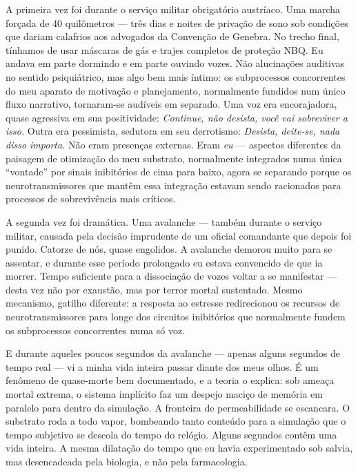 \documentclass[11pt, twoside, openright]{book}
\begin{document}
A primeira vez foi durante o serviço militar obrigatório austríaco. Uma marcha forçada de 40 quilômetros --- três dias e noites de privação de sono sob condições que dariam calafrios aos advogados da Convenção de Genebra. No trecho final, tínhamos de usar máscaras de gás e trajes completos de proteção NBQ. Eu andava em parte dormindo e em parte ouvindo vozes. Não alucinações auditivas no sentido psiquiátrico, mas algo bem mais íntimo: os subprocessos concorrentes do meu aparato de motivação e planejamento, normalmente fundidos num único fluxo narrativo, tornaram-se audíveis em separado. Uma voz era encorajadora, quase agressiva em sua positividade: \textit{Continue, não desista, você vai sobreviver a isso.} Outra era pessimista, sedutora em seu derrotismo: \textit{Desista, deite-se, nada disso importa.} Não eram presenças externas. Eram \textit{eu} --- aspectos diferentes da paisagem de otimização do meu substrato, normalmente integrados numa única ``vontade'' por sinais inibitórios de cima para baixo, agora se separando porque os neurotransmissores que mantêm essa integração estavam sendo racionados para processos de sobrevivência mais críticos.

A segunda vez foi dramática. Uma avalanche --- também durante o serviço militar, causada pela decisão imprudente de um oficial comandante que depois foi punido. Catorze de nós, quase engolidos. A avalanche demorou muito para se assentar, e durante esse período prolongado eu estava convencido de que ia morrer. Tempo suficiente para a dissociação de vozes voltar a se manifestar --- desta vez não por exaustão, mas por terror mortal sustentado. Mesmo mecanismo, gatilho diferente: a resposta ao estresse redirecionou os recursos de neurotransmissores para longe dos circuitos inibitórios que normalmente fundem os subprocessos concorrentes numa só voz.

E durante aqueles poucos segundos da avalanche --- apenas alguns segundos de tempo real --- vi a minha vida inteira passar diante dos meus olhos. É um fenômeno de quase-morte bem documentado, e a teoria o explica: sob ameaça mortal extrema, o sistema implícito faz um despejo maciço de memória em paralelo para dentro da simulação. A fronteira de permeabilidade se escancara. O substrato roda a todo vapor, bombeando tanto conteúdo para a simulação que o tempo subjetivo se descola do tempo do relógio. Alguns segundos contêm uma vida inteira. A mesma dilatação do tempo que eu havia experimentado sob salvia, mas desencadeada pela biologia, e não pela farmacologia.
\end{document}
